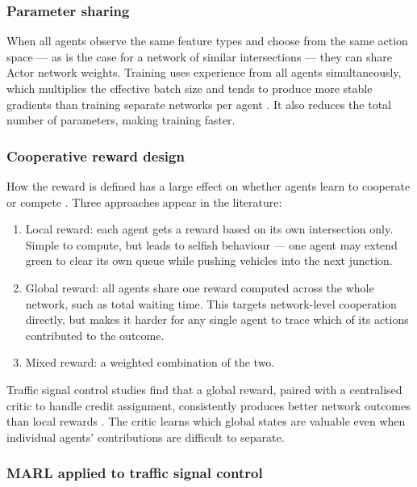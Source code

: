 \documentclass[11pt, a4paper]{report}
\begin{document}
\subsubsection{Parameter sharing}

When all agents observe the same feature types and choose from the same action space --- as is the case for a network of similar intersections --- they can share Actor network weights. Training uses experience from all agents simultaneously, which multiplies the effective batch size and tends to produce more stable gradients than training separate networks per agent \cite{gupta2017cooperative}. It also reduces the total number of parameters, making training faster.

\subsubsection{Cooperative reward design}

How the reward is defined has a large effect on whether agents learn to cooperate or compete \cite{chu2019multi}. Three approaches appear in the literature:

\begin{enumerate}
    \item Local reward: each agent gets a reward based on its own intersection only. Simple to compute, but leads to selfish behaviour --- one agent may extend green to clear its own queue while pushing vehicles into the next junction.
    \item Global reward: all agents share one reward computed across the whole network, such as total waiting time. This targets network-level cooperation directly, but makes it harder for any single agent to trace which of its actions contributed to the outcome.
    \item Mixed reward: a weighted combination of the two.
\end{enumerate}

Traffic signal control studies find that a global reward, paired with a centralised critic to handle credit assignment, consistently produces better network outcomes than local rewards \cite{chu2019multi, wei2019colight}. The critic learns which global states are valuable even when individual agents' contributions are difficult to separate.

\subsubsection{MARL applied to traffic signal control}
\end{document}
